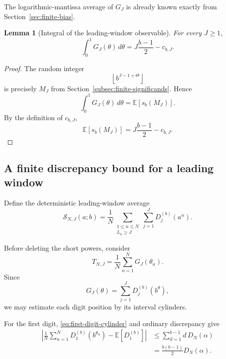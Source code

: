 \documentclass[11pt]{article}
\newtheorem{lemma}[theorem]{Lemma}
\theoremstyle{definition}
\theoremstyle{remark}
\begin{document}
The logarithmic-mantissa average of \(G_J\) is already known exactly
from Section~\ref{sec:finite-bias}.

\begin{lemma}[Integral of the leading-window observable]
\label{lem:G-J-integral}
For every \(J\ge1\),
\begin{equation}
\boxed{
    \int_0^1 G_J(\theta)\,d\theta
    =
    J\frac{b-1}{2}
    -
    c_{b,J}.
}
\label{eq:G-J-integral}
\end{equation}
\end{lemma}

\begin{proof}
The random integer
\[
    \left\lfloor b^{J-1+\Theta}\right\rfloor
\]
is precisely \(M_J\) from
Section~\ref{subsec:finite-significands}.  Hence
\[
    \int_0^1 G_J(\theta)\,d\theta
    =
    \mathbb E[s_b(M_J)].
\]
By the definition of \(c_{b,J}\),
\[
    \mathbb E[s_b(M_J)]
    =
    J\frac{b-1}{2}-c_{b,J}.
\]
\end{proof}


\subsection{A finite discrepancy bound for a leading window}
\label{subsec:finite-leading-window-bound}

Define the deterministic leading-window average
\begin{equation}
    \mathcal S_{N,J}(a;b)
    =
    \frac1N
    \sum_{\substack{1\le n\le N\\L_n\ge J}}
    \sum_{j=1}^{J}
    D_j^{(b)}(a^n).
    \label{eq:S-NJ-main}
\end{equation}

Before deleting the short powers, consider
\[
    T_{N,J}
    =
    \frac1N
    \sum_{n=1}^{N}G_J(\theta_n).
\]
Since
\[
    G_J(\theta)
    =
    \sum_{j=1}^{J}D_j^{(b)}(b^\theta),
\]
we may estimate each digit position by its interval cylinders.

For the first digit,
\eqref{eq:first-digit-cylinder} and ordinary discrepancy give
\begin{equation}
\begin{aligned}
    \left|
        \frac1N\sum_{n=1}^{N}
        D_1^{(b)}(b^{\theta_n})
        -
        \mathbb E[D_1^{(b)}]
    \right|
    &\le
    \sum_{d=1}^{b-1}d\,D_N(\alpha)
    \\
    &=
    \frac{b(b-1)}{2}D_N(\alpha).
\end{aligned}
\label{eq:first-digit-weighted-discrepancy}
\end{equation}
\end{document}
